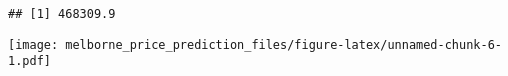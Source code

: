 \documentclass[]{article}
\newenvironment{Shaded}{\begin{snugshade}}{\end{snugshade}}
\newcommand{\DataTypeTok}[1]{\textcolor[rgb]{0.13,0.29,0.53}{#1}}
\newcommand{\KeywordTok}[1]{\textcolor[rgb]{0.13,0.29,0.53}{\textbf{#1}}}
\newcommand{\NormalTok}[1]{#1}
\newcommand{\OperatorTok}[1]{\textcolor[rgb]{0.81,0.36,0.00}{\textbf{#1}}}
\begin{document}
\begin{verbatim}
## [1] 468309.9
\end{verbatim}

\begin{Shaded}
\end{Shaded}

\texttt{[image: melborne\_price\_prediction\_files/figure-latex/unnamed-chunk-6-1.pdf]}
\end{document}
